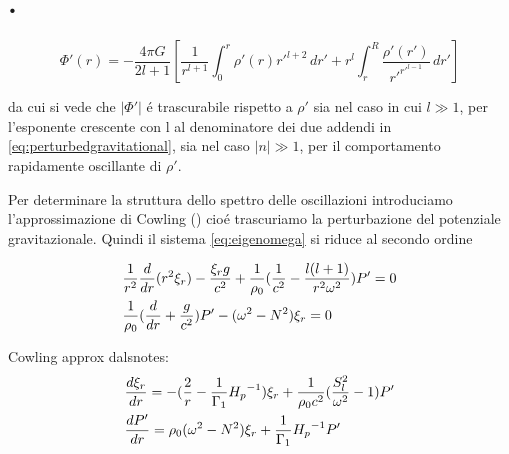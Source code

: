 \documentclass[../main.tex]{subfiles}
\begin{document}
\section{.}

\begin{workout}

\begin{equation}
\Phi'(r)=-\frac{4\pi G}{2l+1}\left[\frac{1}{r^{l+1}}\int_0^r\rho'(r)r'^{l+2}\,dr'+r^l\int_r^R\frac{\rho'(r')}{r'^{r'^{l-1}}}\,dr'\right]\label{eq:perturbedgravitational}
\end{equation}

da cui si vede che $|\Phi'|$ \'e trascurabile rispetto a $\rho'$ sia nel caso in cui $l\gg1$, per l'esponente crescente con l al denominatore dei due addendi in \eqref{eq:perturbedgravitational}, sia nel caso $|n|\gg1$, per il comportamento rapidamente oscillante di $\rho'$.


Per determinare la struttura dello spettro delle oscillazioni introduciamo l'approssimazione di Cowling (\cite{cow41oscillations}) cio\'e trascuriamo la perturbazione del potenziale gravitazionale. Quindi il sistema \eqref{eq:eigenomega} si riduce al secondo ordine

\begin{subequations}\label{cowosc:main}
\begin{align}
&\frac{1}{r^2}\TDof{r}(r^2\xi_r)-\frac{\xi_rg}{c^2}+\frac{1}{\rho_0}(\frac{1}{c^2}-\frac{l(l+1)}{r^2\omega^2})P'=0\label{cowosc:a}\\
&\frac{1}{\rho_0}(\TDof{r}+\frac{g}{c^2})P'-(\omega^2-N^2)\xi_r=0\label{cowosc:b}
\end{align}
\end{subequations}

Cowling approx dalsnotes:
\begin{subequations}
\begin{align}
&\TDy{r}{\xi_r}=-(\frac{2}{r}-\frac{1}{\Gamma_1}\invers{H_p})\xi_r+\frac{1}{\rho_0c^2}(\frac{S_l^2}{\omega^2}-1)P'\\
&\TDy{r}{P'}=\rho_0(\omega^2-N^2)\xi_r+\frac{1}{\Gamma_1}\invers{H_p}P'\\
\end{align}
\end{subequations}

\end{workout}
\end{document}
